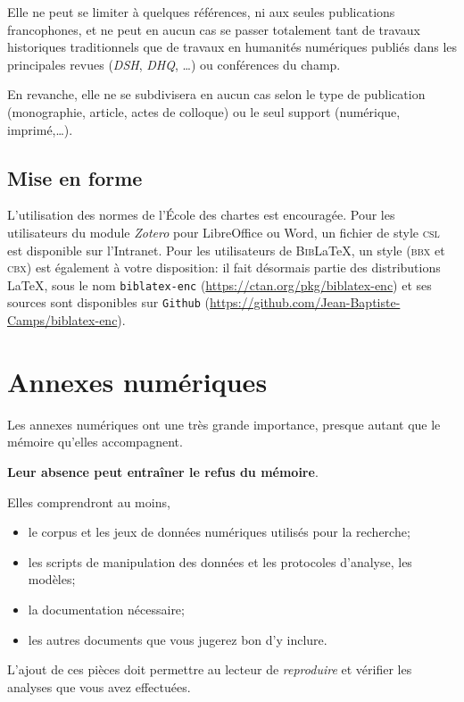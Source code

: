 \documentclass[a4paper,twoside,12pt]{book}
\begin{document}
Elle ne peut se limiter à quelques références, ni aux seules publications francophones, et ne peut en aucun cas se passer totalement tant de travaux historiques traditionnels que de travaux en \og{}humanités numériques\fg{} publiés dans les principales revues (\textit{DSH}, \textit{DHQ}, …) ou conférences du champ.

En revanche, elle ne se subdivisera en aucun cas selon le type de publication (monographie, article, actes de colloque) ou le seul support (numérique, imprimé,…).

\subsection{Mise en forme}

L'utilisation des normes de l'École des chartes est encouragée. 
Pour les utilisateurs du module \textit{Zotero} pour LibreOffice ou Word, un fichier de style \textsc{csl} est disponible sur l'Intranet. Pour les utilisateurs de \textsc{Bib}\LaTeX{}, un style (\textsc{bbx} et \textsc{cbx}) est également à votre disposition: il fait désormais partie des distributions \LaTeX{}, sous le nom \texttt{biblatex-enc} (\url{https://ctan.org/pkg/biblatex-enc}) et ses sources sont disponibles sur \texttt{Github} (\url{https://github.com/Jean-Baptiste-Camps/biblatex-enc}).

\section{Annexes numériques}

Les annexes numériques ont une très grande importance, presque autant que le mémoire qu'elles accompagnent. 

\textbf{Leur absence peut entraîner le refus du mémoire}.

Elles comprendront au moins,
\begin{itemize}
	\item le corpus et les jeux de données numériques utilisés pour la recherche;
	\item les scripts de manipulation des données et les protocoles d'analyse, les modèles;
	\item la documentation nécessaire;
	\item les autres documents que vous jugerez bon d'y inclure.
\end{itemize}


L'ajout de ces pièces doit permettre au lecteur de \textit{reproduire} et vérifier les analyses que vous avez effectuées.
\end{document}
